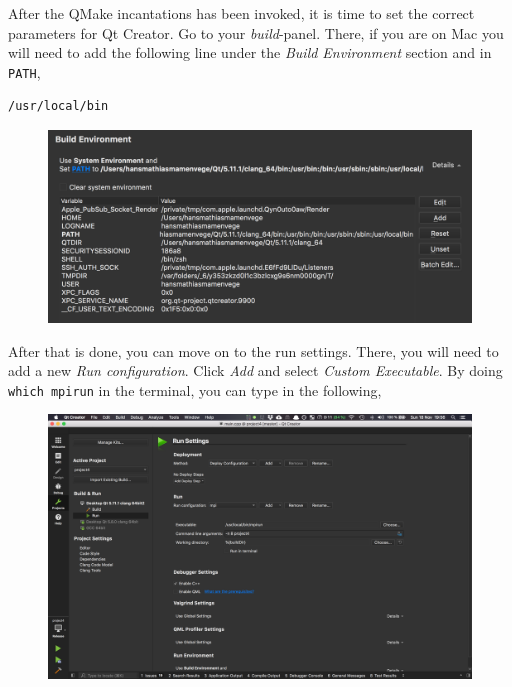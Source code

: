 \documentclass[11pt]{article}
\begin{document}
After the QMake incantations has been invoked, it is time to set the correct parameters for Qt Creator. Go to your \textit{build}-panel. There, if you are on Mac you will need to add the following line under the \textit{Build Environment} section and in \texttt{PATH},
\begin{lstlisting}
/usr/local/bin
\end{lstlisting}
\begin{figure}[H]
    \centering
    \includegraphics[width=\textwidth]{figures/mpi/mpi_build_envoirement.png}
\end{figure}

After that is done, you can move on to the run settings. There, you will need to add a new \textit{Run configuration}. Click \textit{Add} and select \textit{Custom Executable}. By doing \texttt{which mpirun} in the terminal, you can type in the following,
\begin{figure}[H]
    \centering
    \includegraphics[width=\textwidth]{figures/mpi/mpi_run_settings.png}
\end{figure}
\end{document}
